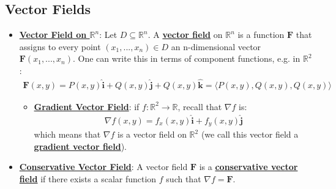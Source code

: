 \documentclass[11pt]{article}
\newcommand{\dfn}[1]{\underline{\textbf{#1}}}
\newcommand{\R}[0]{\mathbb{R}}
\begin{document}
\subsection{Vector Fields}
\begin{itemize}[noitemsep]
	\item \dfn{Vector Field on $\R^n$}: Let $D \subseteq \R^n$. A \dfn{vector field} on $\R^n$ is a function $\mathbf{F}$ that assigns to every point $(x_1, ..., x_n) \in D$ an n-dimensional vector $\mathbf{F}(x_1, ..., x_n)$. One can write this in terms of component functions, e.g. in $\R^2$: 
	\begin{align}
		\mathbf{F}(x,y) = P(x,y) \mathbf{\hat{i}} + Q(x,y) \mathbf{\hat{j}} + Q(x,y) \hat{\mathbf{k}}  = \langle P(x,y), Q(x,y), Q(x,y) \rangle 	
	\end{align}
	\begin{itemize}
		\item \dfn{Gradient Vector Field}: if $f: \R^2 \rightarrow \R$, recall that $\nabla f$ is: 
		\begin{align}
			\nabla f(x,y) = f_x(x,y) \hat{\mathbf{i}} + f_y(x,y) \hat{\mathbf{j}} 	
		\end{align}
		which means that $\nabla f$ is a vector field on $\R^2$ (we call this vector field a \dfn{gradient vector field}).
	\end{itemize}
	\item \dfn{Conservative Vector Field}: A vector field $\mathbf{F}$ is a \dfn{conservative vector field} if there exists a scalar function $f$ such that $\nabla f = \mathbf{F}$. 
\end{itemize}
\end{document}
